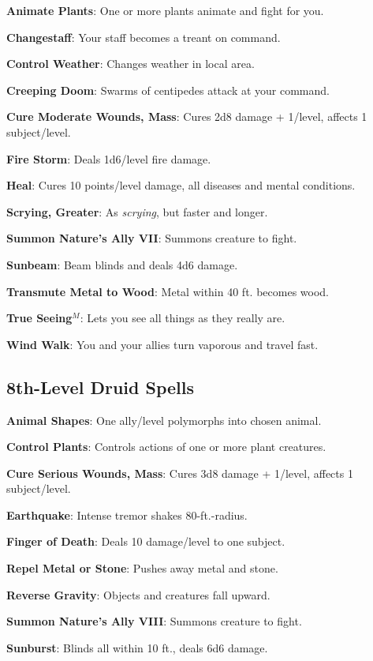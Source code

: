 \textbf{Animate Plants}: One or more plants animate and fight for you.

\textbf{Changestaff}: Your staff becomes a treant on command.

\textbf{Control Weather}: Changes weather in local area.

\textbf{Creeping Doom}: Swarms of centipedes attack at your command.

\textbf{Cure Moderate Wounds, Mass}: Cures 2d8 damage + 1/level, affects 1 subject/level.

\textbf{Fire Storm}: Deals 1d6/level fire damage.

\textbf{Heal}: Cures 10 points/level damage, all diseases and mental conditions.

\textbf{Scrying, Greater}: As \textit{scrying}, but faster and longer.

\textbf{Summon Nature's Ally VII}: Summons creature to fight.

\textbf{Sunbeam}: Beam blinds and deals 4d6 damage.

\textbf{Transmute Metal to Wood}: Metal within 40 ft. becomes wood.

\textbf{True Seeing}\(^{M}\): Lets you see all things as they really are.

\textbf{Wind Walk}: You and your allies turn vaporous and travel fast.

\subsection{8th-Level Druid Spells}


\textbf{Animal Shapes}: One ally/level polymorphs into chosen animal.

\textbf{Control Plants}: Controls actions of one or more plant creatures.

\textbf{Cure Serious Wounds, Mass}: Cures 3d8 damage + 1/level, affects 1 subject/level.

\textbf{Earthquake}: Intense tremor shakes 80-ft.-radius.

\textbf{Finger of Death}: Deals 10 damage/level to one subject.

\textbf{Repel Metal or Stone}: Pushes away metal and stone.

\textbf{Reverse Gravity}: Objects and creatures fall upward.

\textbf{Summon Nature's Ally VIII}: Summons creature to fight.

\textbf{Sunburst}: Blinds all within 10 ft., deals 6d6 damage.


